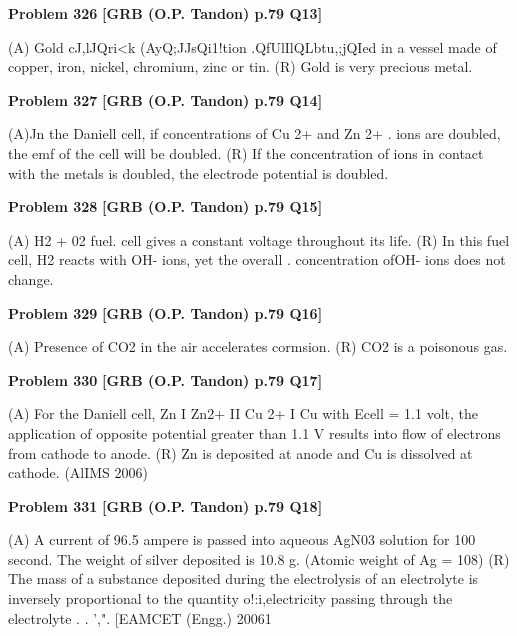 \begin{problembox}
\textbf{Problem 326} \hfill \textbf{[GRB (O.P. Tandon) p.79 Q13]}
\label{q:ext-grb_all_questions-326}

(A) Gold \underline{\hspace{1cm}}cJ,lJQri<k (AyQ;JJsQi1!tion \underline{\hspace{1cm}}.QfUlIlQLbtu,;jQIed in a 
vessel made of copper, iron, nickel, chromium, zinc or tin. 
(R) Gold is very precious metal.
\end{problembox}

\begin{problembox}
\textbf{Problem 327} \hfill \textbf{[GRB (O.P. Tandon) p.79 Q14]}
\label{q:ext-grb_all_questions-327}

(A)Jn the Daniell cell, if concentrations of Cu 2+ and Zn 2+ 
. ions are doubled, the emf of the cell will be doubled. 
(R) If the concentration of ions in contact with the metals is 
doubled, the electrode potential is doubled.
\end{problembox}

\begin{problembox}
\textbf{Problem 328} \hfill \textbf{[GRB (O.P. Tandon) p.79 Q15]}
\label{q:ext-grb_all_questions-328}

(A) H2 + 02 fuel. cell gives a constant voltage throughout its 
life. 
(R) In this fuel cell, H2 reacts with OH- ions, yet the overall 
. concentration ofOH- ions does not change.
\end{problembox}

\begin{problembox}
\textbf{Problem 329} \hfill \textbf{[GRB (O.P. Tandon) p.79 Q16]}
\label{q:ext-grb_all_questions-329}

(A) Presence of CO2 in the air accelerates cormsion. 
(R) CO2 is a poisonous gas.
\end{problembox}

\begin{problembox}
\textbf{Problem 330} \hfill \textbf{[GRB (O.P. Tandon) p.79 Q17]}
\label{q:ext-grb_all_questions-330}

(A) For the Daniell cell, Zn I Zn2+ II Cu 2+ I Cu with Ecell = 1.1 
volt, the application of opposite potential greater than 1.1 V 
results into flow of electrons from cathode to anode. 
(R) Zn is deposited at anode and Cu is dissolved at cathode. 
(AlIMS 2006)
\end{problembox}

\begin{problembox}
\textbf{Problem 331} \hfill \textbf{[GRB (O.P. Tandon) p.79 Q18]}
\label{q:ext-grb_all_questions-331}

(A) A current of 96.5 ampere is passed into aqueous AgN03 
solution for 100 second. The weight of silver deposited is 
10.8 g. (Atomic weight of Ag = 108) 
(R) The mass of a substance deposited during the electrolysis 
of an electrolyte is inversely proportional to the quantity 
o!:i,electricity passing through the electrolyte . 
. ',". 
[EAMCET (Engg.) 20061
\end{problembox}

